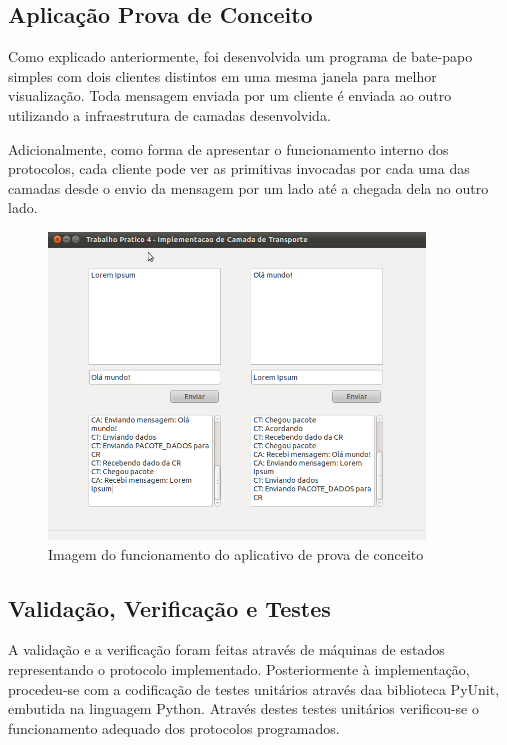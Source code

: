 \documentclass[brazil,times,12pt]{abnt}
\begin{document}
	
\subsection*{Aplicação Prova de Conceito}
	Como explicado anteriormente, foi desenvolvida um programa de bate-papo
	simples com dois clientes distintos em uma mesma janela para melhor
	visualização. Toda mensagem enviada por um cliente é enviada ao outro
	utilizando a infraestrutura de camadas desenvolvida.
	
	Adicionalmente, como forma de apresentar o funcionamento interno dos
	protocolos, cada cliente pode ver as primitivas invocadas por cada uma das
	camadas desde o envio da mensagem por um lado até a chegada dela no outro
	lado.
	
	\begin{figure}[htp]
	\begin{center}
	  \includegraphics[width=100mm]{imagens/Aplicativo.png}
	  \caption[aplicativo]{Imagem do funcionamento do aplicativo de prova de
	  conceito}
	  \label{aplicativo}
	\end{center}
	\end{figure}


\subsection*{Validação, Verificação e Testes}
	A validação e a verificação foram feitas através de máquinas de estados
	representando o protocolo implementado. Posteriormente à implementação,
	procedeu-se com a codificação de testes unitários através daa biblioteca
	PyUnit, embutida na linguagem Python. Através destes testes unitários
	verificou-se o funcionamento adequado dos protocolos programados.
\end{document}
